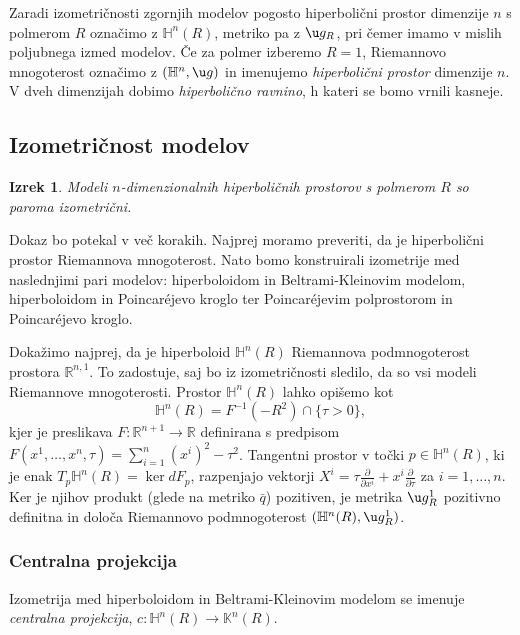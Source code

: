 \documentclass[a4paper]{article}
\newtheorem{izrek}{Izrek}
\begin{document}
Zaradi izometričnosti zgornjih modelov pogosto hiperbolični prostor dimenzije $n$ s polmerom $R$ označimo z $\mathbb{H}^{n}(R)$, metriko pa z $\u g_{R}$, pri čemer imamo v mislih poljubnega izmed modelov. Če za polmer izberemo $R=1$, Riemannovo mnogoterost označimo z $(\mathbb{H}^{n}, \u g)$ in imenujemo \emph{hiperbolični prostor} dimenzije $n$. V dveh dimenzijah dobimo \emph{hiperbolično ravnino}, h kateri se bomo vrnili kasneje.

\subsection{Izometričnost modelov}

\begin{izrek}
Modeli $n$-dimenzionalnih hiperboličnih prostorov s polmerom $R$ so paroma izometrični.
\end{izrek}

Dokaz bo potekal v več korakih. Najprej moramo preveriti, da je hiperbolični prostor Riemannova mnogoterost. Nato bomo konstruirali izometrije med naslednjimi pari modelov: hiperboloidom in Beltrami-Kleinovim modelom, hiperboloidom in Poincar\'ejevo kroglo ter Poincar\'ejevim polprostorom in Poincar\'ejevo kroglo.

Dokažimo najprej, da je hiperboloid $\mathbb{H}^{n}(R)$ Riemannova podmnogoterost prostora $\mathbb{R}^{n,1}$. To zadostuje, saj bo iz izometričnosti sledilo, da so vsi modeli Riemannove mnogoterosti.
Prostor $\mathbb{H}^{n}(R)$ lahko opišemo kot 
\begin{equation}\label{eq:H^n enacba}
\mathbb{H}^{n}(R) = F^{-1}(-R^2) \cap \{ \tau>0 \},
\end{equation}
kjer je preslikava $F \colon \mathbb{R}^{n+1} \to \mathbb{R}$ definirana s predpisom $F(x^{1}, \dots , x^{n}, \tau) = \sum_{i=1}^{n} (x^{i})^2 - \tau^2$.
Tangentni prostor v točki $p \in \mathbb{H}^{n}(R)$, ki je enak $T_{p}\mathbb{H}^{n}(R) = \ker dF_{p}$, razpenjajo vektorji $X^{i} = \tau \frac{\partial}{\partial x^{i}} + x^{i} \frac{\partial}{\partial \tau}$ za $i = 1, \dots , n$. Ker je njihov produkt (glede na metriko $\bar{q}$) pozitiven, je metrika $\u g_{R}^{1}$ pozitivno definitna in določa Riemannovo podmnogoterost $(\mathbb{H}^{n}(R), \u g_{R}^{1})$. 

\subsubsection{Centralna projekcija}
Izometrija med hiperboloidom in Beltrami-Kleinovim modelom se imenuje \emph{centralna projekcija}, $c \colon \mathbb{H}^{n}(R) \to \mathbb{K}^{n}(R)$.
\end{document}
